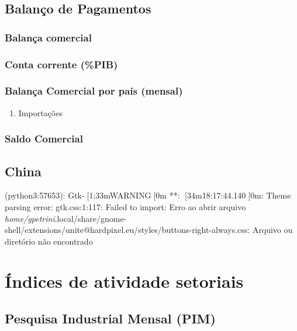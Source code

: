\documentclass[11pt]{article}
\begin{document}
\subsection{Balanço de Pagamentos}
\label{sec:orgb9d5873}



\subsubsection{Balança comercial}
\label{sec:org73d9e7a}


\subsubsection{Conta corrente (\%PIB)}
\label{sec:org0dbf903}

\subsubsection{Balança Comercial por país (mensal)}
\label{sec:org6b7ff34}


\begin{enumerate}
\item Importações
\label{sec:orgbe34ec2}
\end{enumerate}


\subsubsection{Saldo Comercial}
\label{sec:org8130ef9}

\subsection{China}
\label{sec:orgc8b78ff}



(python3:57653): Gtk-[1;33mWARNING[0m **: [34m18:17:44.140[0m: Theme parsing error: gtk.css:1:117: Failed to import: Erro ao abrir arquivo \emph{home/gpetrini}.local/share/gnome-shell/extensions/unite@hardpixel.eu/styles/buttons-right-always.css: Arquivo ou diretório não encontrado


\section{Índices de atividade setoriais}
\label{sec:orgdb6b589}



\subsection{Pesquisa Industrial Mensal (PIM)}
\label{sec:org4a63bf7}
\end{document}
